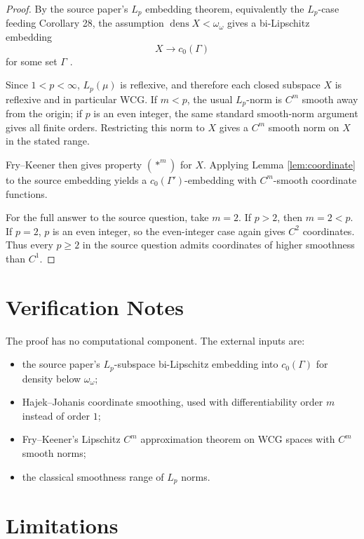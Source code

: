 \documentclass[11pt]{article}
\newcommand{\dens}{\operatorname{dens}}
\begin{document}
\begin{proof}
By the source paper's \(L_p\) embedding theorem, equivalently the
\(L_p\)-case feeding Corollary 28, the assumption
\(\dens X<\omega_\omega\) gives a bi-Lipschitz embedding
\[
  X\longrightarrow c_0(\Gamma)
\]
for some set \(\Gamma\) \cite[Corollary 26]{HJS240100831}.

Since \(1<p<\infty\), \(L_p(\mu)\) is reflexive, and therefore each closed
subspace \(X\) is reflexive and in particular WCG.  If \(m<p\), the usual
\(L_p\)-norm is \(C^m\) smooth away from the origin; if \(p\) is an even
integer, the same standard smooth-norm argument gives all finite orders.
Restricting this norm to \(X\) gives a \(C^m\) smooth norm on \(X\) in the
stated range.

Fry--Keener \cite[Theorem 4]{FryKeener09070241} then gives property
\((\ast^m)\) for \(X\).  Applying Lemma \ref{lem:coordinate} to the source
embedding yields a \(c_0(\Gamma')\)-embedding with \(C^m\)-smooth coordinate
functions.

For the full answer to the source question, take \(m=2\).  If \(p>2\), then
\(m=2<p\).  If \(p=2\), \(p\) is an even integer, so the even-integer case
again gives \(C^2\) coordinates.  Thus every \(p\ge2\) in the source question
admits coordinates of higher smoothness than \(C^1\).
\end{proof}

\section*{Verification Notes}

The proof has no computational component.  The external inputs are:
\begin{itemize}
\item the source paper's \(L_p\)-subspace bi-Lipschitz embedding into
\(c_0(\Gamma)\) for density below \(\omega_\omega\);
\item Hajek--Johanis coordinate smoothing, used with differentiability order
\(m\) instead of order \(1\);
\item Fry--Keener's Lipschitz \(C^m\) approximation theorem on WCG spaces with
\(C^m\) smooth norms;
\item the classical smoothness range of \(L_p\) norms.
\end{itemize}

\section*{Limitations}
\end{document}

